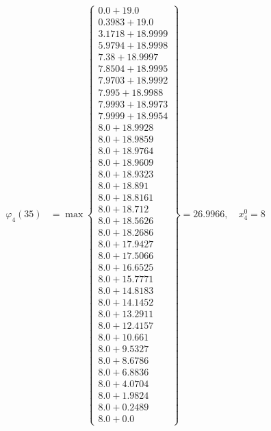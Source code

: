 \documentclass{article}
\begin{document}
\begin{align*}
\varphi_{4}(35) &= \max \left\{ \begin{array}{c}
0.0 + 19.0 \\
 0.3983 + 19.0 \\
 3.1718 + 18.9999 \\
 5.9794 + 18.9998 \\
 7.38 + 18.9997 \\
 7.8504 + 18.9995 \\
 7.9703 + 18.9992 \\
 7.995 + 18.9988 \\
 7.9993 + 18.9973 \\
 7.9999 + 18.9954 \\
 8.0 + 18.9928 \\
 8.0 + 18.9859 \\
 8.0 + 18.9764 \\
 8.0 + 18.9609 \\
 8.0 + 18.9323 \\
 8.0 + 18.891 \\
 8.0 + 18.8161 \\
 8.0 + 18.712 \\
 8.0 + 18.5626 \\
 8.0 + 18.2686 \\
 8.0 + 17.9427 \\
 8.0 + 17.5066 \\
 8.0 + 16.6525 \\
 8.0 + 15.7771 \\
 8.0 + 14.8183 \\
 8.0 + 14.1452 \\
 8.0 + 13.2911 \\
 8.0 + 12.4157 \\
 8.0 + 10.661 \\
 8.0 + 9.5327 \\
 8.0 + 8.6786 \\
 8.0 + 6.8836 \\
 8.0 + 4.0704 \\
 8.0 + 1.9824 \\
 8.0 + 0.2489 \\
 8.0 + 0.0
\end{array} \right\}=26.9966, \quad x_{4}^0=8\\
  

\end{align*}
\end{document}
